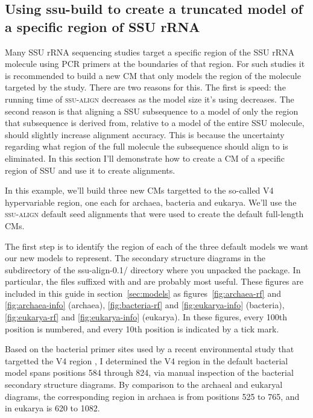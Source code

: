 \subsection{Using ssu-build to create a truncated model of a specific region of SSU rRNA}

Many SSU rRNA sequencing studies target a specific region of the SSU
rRNA molecule using PCR primers at the boundaries of that region. For
such studies it is recommended to build a new CM that only models the
region of the molecule targeted by the study. There are two reasons
for this. The first is speed: the running time of \textsc{ssu-align}
decreases as the model size it's using decreases. The second reason is
that aligning a SSU subsequence to a model of only the region that
subsequence is derived from, relative to a model of the entire SSU
molecule, should slightly increase alignment accuracy. This is because
the uncertainty regarding what region of the full molecule the subsequence
should align to is eliminated. In this section I'll demonstrate how to
create a CM of a specific region of SSU and use it to create
alignments. 

In this example, we'll build three new CMs targetted to the so-called
V4 hypervariable region, one each for archaea, bacteria and
eukarya. We'll use the \textsc{ssu-align} default seed alignments that
were used to create the default full-length CMs. 

The first step is to identify the region of each of the three default
models we want our new models to represent. The secondary structure
diagrams in the  subdirectory of the
{ssu-align-0.1/} directory where you unpacked the package.
In particular, the files suffixed with  and
 are probably most useful. These figures are included
in this guide in section~\ref{sec:models} as
figures~\ref{fig:archaea-rf} and \ref{fig:archaea-info} (archaea),
\ref{fig:bacteria-rf} and \ref{fig:eukarya-info} (bacteria),
\ref{fig:eukarya-rf} and \ref{fig:eukarya-info} (eukarya).
In these figures, every 100th position is numbered, and every 10th
position is indicated by a tick mark.

Based on the bacterial primer sites used by a recent environmental
study that targetted the V4 region \cite{Claesson09}, I determined 
the V4 region in the default bacterial model spans positions 584
through 824, via manual inspection of the bacterial secondary structure
diagrams. By comparison to the archaeal and eukaryal diagrams, 
the corresponding region in archaea is from positions 525 to
765, and in eukarya is 620 to 1082. 

